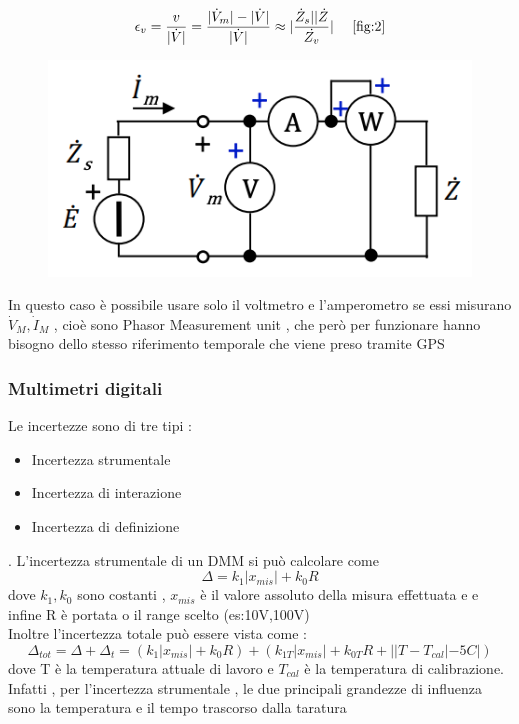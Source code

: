 \documentclass{article}
\theoremstyle{definition}
\newcommand{\abs}[1]{|#1|}
\begin{document}
$$\epsilon_v=\frac{v}{\abs{\dot{V}}}=\frac{|\dot{V}_m|-|\dot{V}|}{|\dot{V}|}\approx \abs{\frac{\dot{Z}_s||\dot{Z}}{\dot{Z_v}}}\ \ \ \ \ref{fig:2}$$
\vspace{0.2cm}
\begin{figure}[h]
\centering
\includegraphics[scale=0.35]{immagini/wattAC}
\end{figure}

In questo caso è possibile usare solo il voltmetro e l'amperometro se essi misurano $\dot{V}_M , \dot{I}_M$ , cioè sono Phasor Measurement unit , che però per funzionare hanno bisogno dello stesso riferimento temporale che viene preso tramite GPS
\subsubsection{Multimetri digitali }
Le incertezze sono di tre tipi :
\begin{itemize}
	\item Incertezza strumentale
	\item Incertezza di interazione 
	\item Incertezza di definizione
\end{itemize}.
L'incertezza strumentale di un DMM si può calcolare come 
$$\Delta=k_1\abs{x_{mis}}+k_0R$$
dove $k_1,k_0$ sono costanti , $x_{mis}$ è il valore assoluto della misura effettuata e e infine R è portata o il range scelto (es:10V,100V)\\
Inoltre l'incertezza totale può essere vista come :
$$\Delta_{tot}=\Delta+\Delta_t=(k_1\abs{x_{mis}}+k_0R)+(k_{1T}\abs{x_{mis}}+k_{0T}R+\abs{\abs{T-T_{cal}}-5C})$$
dove T è la temperatura attuale di lavoro e $T_{cal}$ è la temperatura di calibrazione.\\
Infatti , per l'incertezza strumentale , le due principali grandezze di influenza sono la temperatura e il tempo trascorso dalla taratura 
\newpage
\end{document}
